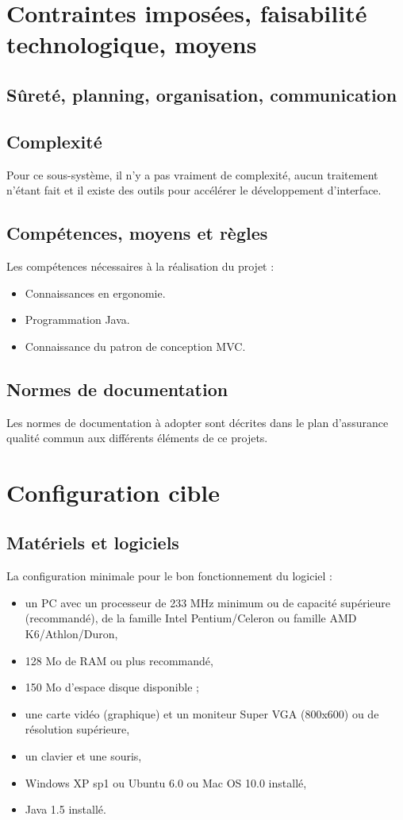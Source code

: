\section{Contraintes imposées, faisabilité technologique, moyens}

\subsection{Sûreté, planning, organisation, communication}

\subsection{Complexité}
Pour ce sous-système, il n'y a pas vraiment de complexité, aucun traitement n'étant fait et il existe des outils pour accélérer le développement d'interface.

\subsection{Compétences, moyens et règles}
Les compétences nécessaires à la réalisation du projet :

\begin{itemize}
\item Connaissances en ergonomie.
\item Programmation Java.
\item Connaissance du patron de conception MVC.
\end{itemize}

\subsection{Normes de documentation}
Les normes de documentation à adopter sont décrites dans le plan d'assurance qualité commun aux différents éléments de ce projets.

\section{Configuration cible}

\subsection{Matériels et logiciels}
La configuration minimale pour le bon fonctionnement du logiciel : 
\begin{itemize}
	\item un PC avec un processeur de 233 MHz minimum ou de capacité supérieure (recommandé), de la famille Intel Pentium/Celeron ou famille AMD K6/Athlon/Duron,
	\item 128 Mo de RAM ou plus recommandé,
	\item 150 Mo d'espace disque disponible ;
	\item une carte vidéo (graphique) et un moniteur Super VGA (800x600) ou de résolution supérieure,
	\item un clavier et une souris,
	\item Windows XP sp1 ou Ubuntu 6.0 ou Mac OS 10.0 installé,
	\item Java 1.5 installé.
\end{itemize}

